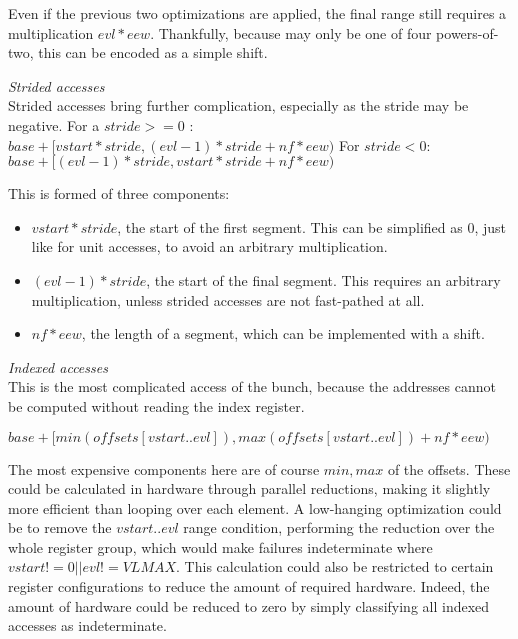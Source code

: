 Even if the previous two optimizations are applied, the final range still requires a multiplication $evl * eew$.
Thankfully, because  may only be one of four powers-of-two, this can be encoded as a simple shift.


\noindent\emph{Strided accesses}\\
\noindent Strided accesses bring further complication, especially as the stride may be negative.
For a $stride >= 0$ : $base + [vstart * stride, (evl - 1) * stride + nf * eew)$
For $stride < 0$: $base + [(evl - 1) * stride, vstart * stride + nf * eew)$

This is formed of three components:
\begin{itemize}
    \item $vstart * stride$, the start of the first segment. This can be simplified as 0, just like for unit accesses, to avoid an arbitrary multiplication.
    \item $(evl - 1) * stride$, the start of the final segment. This requires an arbitrary multiplication, unless strided accesses are not fast-pathed at all.
    \item $nf * eew$, the length of a segment, which can be implemented with a shift.
\end{itemize}


\noindent\emph{Indexed accesses}\\
\noindent This is the most complicated access of the bunch, because the addresses cannot be computed without reading the index register.

$base + [min(offsets[vstart..evl]), max(offsets[vstart..evl]) + nf * eew)$

The most expensive components here are of course $min,max$ of the offsets.
These could be calculated in hardware through parallel reductions, making it slightly more efficient than looping over each element.
A low-hanging optimization could be to remove the $vstart..evl$ range condition, performing the reduction over the whole register group, which would make failures indeterminate where $vstart != 0 || evl != VLMAX$.
This calculation could also be restricted to certain register configurations to reduce the amount of required hardware.
Indeed, the amount of hardware could be reduced to zero by simply classifying all indexed accesses as indeterminate.